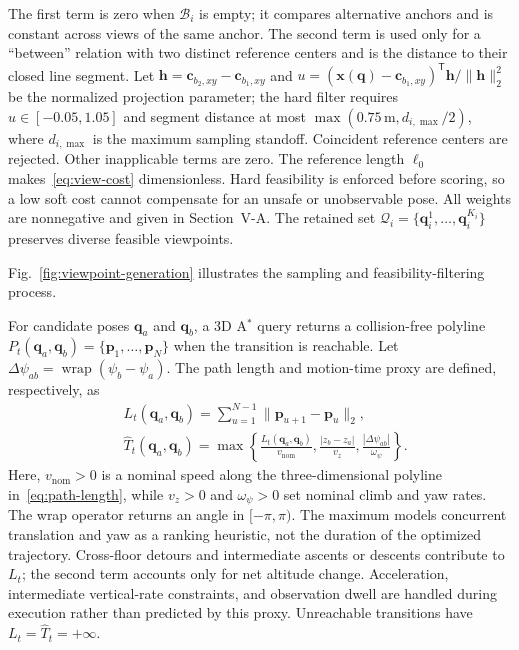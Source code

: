 \documentclass[letterpaper,10pt,journal]{IEEEtran}
\begin{document}
The first term is zero when $\mathcal B_i$ is empty; it compares alternative anchors and is constant across views of the same anchor. The second term is used only for a ``between'' relation with two distinct reference centers and is the distance to their closed line segment. Let $\mathbf h=\mathbf c_{b_2,xy}-\mathbf c_{b_1,xy}$ and $u=(\mathbf x(\mathbf q)-\mathbf c_{b_1,xy})^{\mathsf T}\mathbf h/\|\mathbf h\|_2^2$ be the normalized projection parameter; the hard filter requires $u\in[-0.05,1.05]$ and segment distance at most $\max(0.75\,\mathrm m,d_{i,\max}/2)$, where $d_{i,\max}$ is the maximum sampling standoff. Coincident reference centers are rejected. Other inapplicable terms are zero. The reference length $\ell_0$ makes~\eqref{eq:view-cost} dimensionless. Hard feasibility is enforced before scoring, so a low soft cost cannot compensate for an unsafe or unobservable pose. All weights are nonnegative and given in Section~V-A. The retained set $\mathcal Q_i=\{\mathbf q_i^1,\ldots,\mathbf q_i^{K_i}\}$ preserves diverse feasible viewpoints.

Fig.~\ref{fig:viewpoint-generation} illustrates the sampling and feasibility-filtering process.



For candidate poses $\mathbf{q}_a$ and $\mathbf{q}_b$, a 3D A$^*$ query returns a collision-free polyline $P_t(\mathbf{q}_a,\mathbf{q}_b)=\{\mathbf{p}_1,\ldots,\mathbf{p}_N\}$ when the transition is reachable. Let $\Delta\psi_{ab}=\operatorname{wrap}(\psi_b-\psi_a)$. The path length and motion-time proxy are defined, respectively, as
\begin{subequations}\label{eq:motion-cost}
\begin{align}
&L_t(\mathbf{q}_a,\mathbf{q}_b)
=\sum_{u=1}^{N-1}\lVert\mathbf{p}_{u+1}-\mathbf{p}_u\rVert_2,
\label{eq:path-length}\\
&\widehat T_t(\mathbf{q}_a,\mathbf{q}_b)
=\max\left\{
\tfrac{L_t(\mathbf{q}_a,\mathbf{q}_b)}{v_{\mathrm{nom}}},
\tfrac{|z_b-z_a|}{v_z},
\tfrac{|\Delta\psi_{ab}|}{\omega_\psi}
\right\}.
\label{eq:motion-time}
\end{align}
\end{subequations}
Here, $v_{\mathrm{nom}}>0$ is a nominal speed along the three-dimensional polyline in~\eqref{eq:path-length}, while $v_z>0$ and $\omega_\psi>0$ set nominal climb and yaw rates. The wrap operator returns an angle in $[-\pi,\pi)$. The maximum models concurrent translation and yaw as a ranking heuristic, not the duration of the optimized trajectory. Cross-floor detours and intermediate ascents or descents contribute to $L_t$; the second term accounts only for net altitude change. Acceleration, intermediate vertical-rate constraints, and observation dwell are handled during execution rather than predicted by this proxy. Unreachable transitions have $L_t=\widehat T_t=+\infty$.
\end{document}
